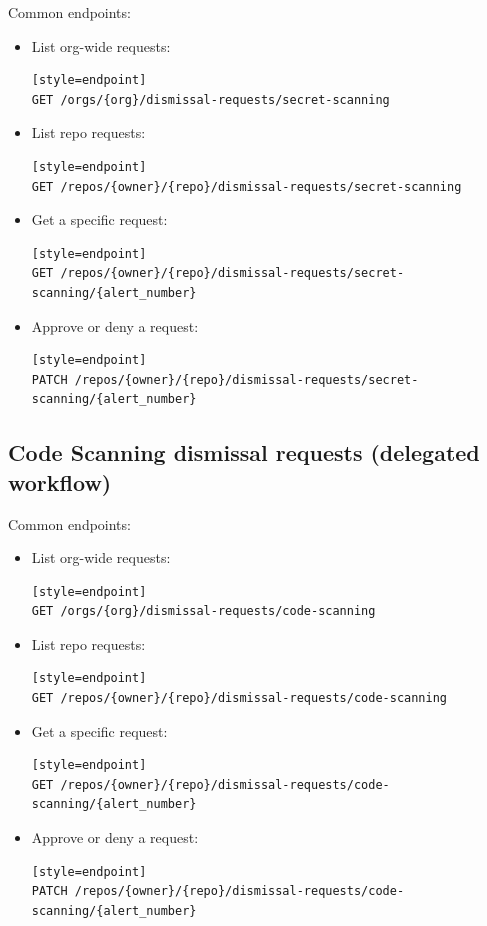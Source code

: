 \documentclass[11pt]{article}
\begin{document}
Common endpoints:
\begin{itemize}
  \item List org-wide requests:
\begin{verbatim}[style=endpoint]
GET /orgs/{org}/dismissal-requests/secret-scanning
\end{verbatim}

  \item List repo requests:
\begin{verbatim}[style=endpoint]
GET /repos/{owner}/{repo}/dismissal-requests/secret-scanning
\end{verbatim}

  \item Get a specific request:
\begin{verbatim}[style=endpoint]
GET /repos/{owner}/{repo}/dismissal-requests/secret-scanning/{alert_number}
\end{verbatim}

  \item Approve or deny a request:
\begin{verbatim}[style=endpoint]
PATCH /repos/{owner}/{repo}/dismissal-requests/secret-scanning/{alert_number}
\end{verbatim}
\end{itemize}

\subsection{Code Scanning dismissal requests (delegated workflow)}

Common endpoints:
\begin{itemize}
  \item List org-wide requests:
\begin{verbatim}[style=endpoint]
GET /orgs/{org}/dismissal-requests/code-scanning
\end{verbatim}

  \item List repo requests:
\begin{verbatim}[style=endpoint]
GET /repos/{owner}/{repo}/dismissal-requests/code-scanning
\end{verbatim}

  \item Get a specific request:
\begin{verbatim}[style=endpoint]
GET /repos/{owner}/{repo}/dismissal-requests/code-scanning/{alert_number}
\end{verbatim}

  \item Approve or deny a request:
\begin{verbatim}[style=endpoint]
PATCH /repos/{owner}/{repo}/dismissal-requests/code-scanning/{alert_number}
\end{verbatim}
\end{itemize}
\end{document}
